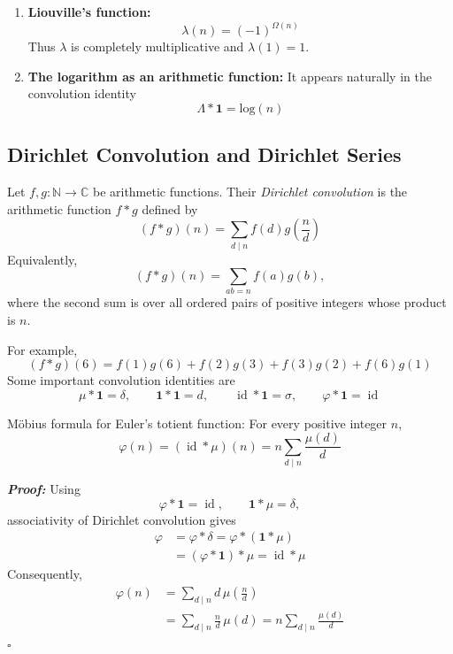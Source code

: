 \documentclass[a4paper,11pt,abstracton]{scrartcl}
\theoremstyle{dotlessP}
\theoremstyle{dotlessS}
\theoremstyle{remark}
\theoremstyle{definition}
\begin{document}
\begin{enumerate}
\item \textbf{Liouville's function:}
\[
    \lambda(n)=(-1)^{\Omega(n)}
\]
Thus $\lambda$ is completely multiplicative and $\lambda(1)=1$.

\item \textbf{The logarithm as an arithmetic function:}
It appears naturally in the convolution identity
\[
    \Lambda*\mathbf{1}= \text{log}(n)
\]
\end{enumerate}

\subsection{Dirichlet Convolution and Dirichlet Series}
\label{subsec:dirichlet-convolution}

\begin{definition_box}
Let $f,g:\mathbb{N}\to\mathbb{C}$ be arithmetic functions. Their
\emph{Dirichlet convolution} is the arithmetic function $f*g$ defined by
\[
    (f*g)(n)=\sum_{d\mid n}f(d)g\!\left(\frac nd\right)
\]
Equivalently,
\[
    (f*g)(n)=\sum_{ab=n}f(a)g(b),
\]
where the second sum is over all ordered pairs of positive integers
whose product is $n$.
\end{definition_box}

\begin{example_box}
For example,
\[
    (f*g)(6)
      =f(1)g(6)+f(2)g(3)+f(3)g(2)+f(6)g(1)
\]
Some important convolution identities are
\[
    \mu*\mathbf{1}=\delta,
    \qquad
    \mathbf{1}*\mathbf{1}=d,
    \qquad
    \operatorname{id}*\mathbf{1}=\sigma,
    \qquad
    \varphi*\mathbf{1}=\operatorname{id}
\]
\end{example_box}

\begin{mainbox}{Möbius formula for Euler's totient function:}
For every positive integer $n$,
\begin{equation}
\label{eq:totient-mobius}
    \varphi(n)
      =(\operatorname{id}*\mu)(n)
      =n\sum_{d\mid n}\frac{\mu(d)}d
\end{equation}
\end{mainbox}

\begin{claim_box}
\textbf{\textit{Proof:}}
Using
\[
    \varphi*\mathbf{1}=\operatorname{id},
    \qquad
    \mathbf{1}*\mu=\delta,
\]
associativity of Dirichlet convolution gives
\begin{align*}
    \varphi
      &=\varphi*\delta
       =\varphi*(\mathbf{1}*\mu)\\
      &=(\varphi*\mathbf{1})*\mu
       =\operatorname{id}*\mu
\end{align*}
Consequently,
\begin{align*}
    \varphi(n)
      &=\sum_{d\mid n}d\,\mu\!\left(\frac nd\right)\\
      &=\sum_{d\mid n}\frac nd\,\mu(d)
       =n\sum_{d\mid n}\frac{\mu(d)}d
\end{align*}
\hfill$\square$
\end{claim_box}
\end{document}
